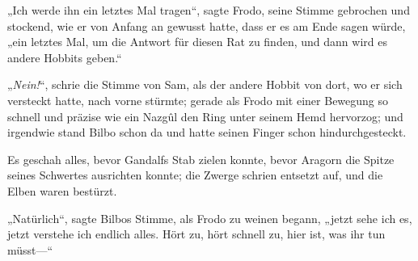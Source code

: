 „Ich werde ihn ein letztes Mal tragen“, sagte Frodo, seine Stimme gebrochen und stockend, wie er von Anfang an gewusst hatte, dass er es am Ende sagen würde, „ein letztes Mal, um die Antwort für diesen Rat zu finden, und dann wird es andere Hobbits geben.“

„\emph{Nein!}“, schrie die Stimme von Sam, als der andere Hobbit von dort, wo er sich versteckt hatte, nach vorne stürmte; gerade als Frodo mit einer Bewegung so schnell und präzise wie ein Nazgûl den Ring unter seinem Hemd hervorzog; und irgendwie stand Bilbo schon da und hatte seinen Finger schon hindurchgesteckt.

Es geschah alles, bevor Gandalfs Stab zielen konnte, bevor Aragorn die Spitze seines Schwertes ausrichten konnte; die Zwerge schrien entsetzt auf, und die Elben waren bestürzt.

„Natürlich“, sagte Bilbos Stimme, als Frodo zu weinen begann, „jetzt sehe ich es, jetzt verstehe ich endlich alles. Hört zu, hört schnell zu, hier ist, was ihr tun müsst—“

